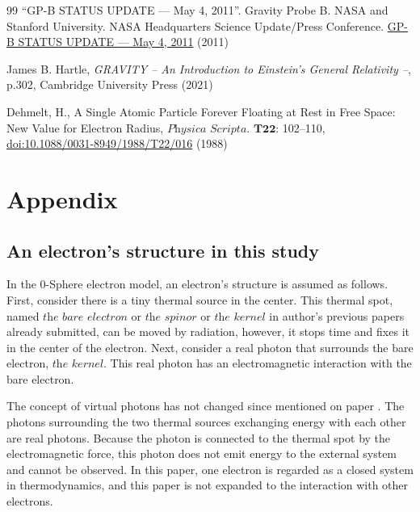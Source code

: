 \documentclass[%
 reprint,
 amsmath,amssymb,
 aps,
]{revtex4-1}
\numberwithin{equation}{section}%
\begin{document}
\begin{thebibliography}{99}
     ``GP-B STATUS UPDATE — May 4, 2011''. Gravity Probe B. NASA and Stanford University. NASA Headquarters Science Update/Press Conference. \href{http://einstein.stanford.edu/highlights/status1.html}{GP-B STATUS UPDATE — May 4, 2011} (2011)

     James B. Hartle, \textit{GRAVITY -- An Introduction to Einstein's General Relativity --}, p.302, Cambridge University Press (2021)

     Dehmelt, H., A Single Atomic Particle Forever Floating at Rest in Free Space: New Value for Electron Radius, $\textit{Physica Scripta}$. $\textbf{T22}$: 102--110, \href{https://iopscience.iop.org/article/10.1088/0031-8949/1988/T22/016}{doi:10.1088/0031-8949/1988/T22/016} (1988)


\end{thebibliography}

\clearpage

\section{Appendix}
\label{Appendix}


\subsection{An electron’s structure in this study}
\label{An electron’s structure in this study}

        In the 0-Sphere electron model, an electron's structure is assumed as follows. First, consider there is a tiny thermal source in the center. This thermal spot, named $\textit{the bare electron}$ or $\textit{the spinor}$ or $\textit{the kernel}$ in author's previous papers already submitted, can be moved by radiation, however, it stops time and fixes it in the center of the electron. Next, consider a real photon that surrounds the bare electron, $\textit{the kernel}$. This real photon has an electromagnetic interaction with the bare electron.

        The concept of virtual photons has not changed since mentioned on paper \cite{Hanamura1}. The photons surrounding the two thermal sources exchanging energy with each other are real photons. Because the photon is connected to the thermal spot by the electromagnetic force, this photon does not emit energy to the external system and cannot be observed. In this paper, one electron is regarded as a closed system in thermodynamics, and this paper is not expanded to the interaction with other electrons.
        
\end{document}

